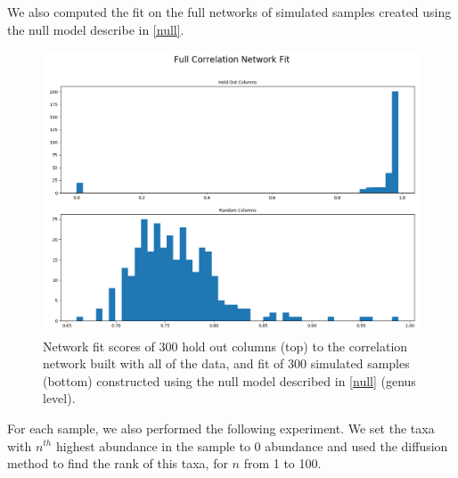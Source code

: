 \documentclass[10pt]{article}
\theoremstyle{definition}
\numberwithin{theorem}{section}
\numberwithin{definition}{section}
\numberwithin{lemma}{section}
\numberwithin{corollary}{section}
\numberwithin{clm}{section}
\numberwithin{rmk}{section}
\begin{document}
We also computed the fit on the full networks of simulated samples created using the null model describe in \cref{null}.

\begin{figure}
	\begin{center}
	\includegraphics[scale = 0.4]{../fit_histo_cor.png}
	\end{center}
	\caption{Network fit scores of 300 hold out columns (top) to the correlation network built with all of the data, and fit of 300 simulated samples (bottom) constructed using the null model described in \cref{null} (genus level).}
\end{figure} 

For each sample, we also performed the following experiment. We set the taxa with $n^{th}$ highest abundance in the sample to $0$ abundance and used the diffusion method to find the rank of this taxa, for $n$ from 1 to 100.
\end{document}
